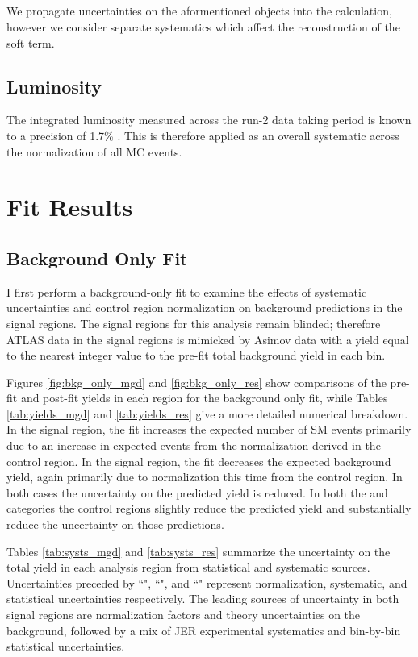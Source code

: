 \subsection{\met}
We propagate uncertainties on the aformentioned objects into the \met calculation, however we consider separate \met systematics which affect the reconstruction of the \met soft term.

\subsection{Luminosity}
The integrated luminosity measured across the run-2 data taking period is known to a precision of 1.7\% \cite{lumi_unc}. This is therefore applied as an overall systematic across the normalization of all MC events.

\section{Fit Results}
\subsection{Background Only Fit}
I first perform a background-only fit to examine the effects of systematic uncertainties and control region normalization on background predictions in the signal regions. The signal regions for this analysis remain blinded; therefore ATLAS data in the signal regions is mimicked by Asimov data with a yield equal to the nearest integer value to the pre-fit total background yield in each bin.

Figures \ref{fig:bkg_only_mgd} and \ref{fig:bkg_only_res} show comparisons of the pre-fit and post-fit yields in each region for the background only fit, while Tables \ref{tab:yields_mgd} and \ref{tab:yields_res} give a more detailed numerical breakdown. In the \merged signal region, the fit increases the expected number of SM events primarily due to an increase in expected \wjets events from the normalization derived in the \merged \wjets control region. In the \resolved signal region, the fit decreases the expected background yield, again primarily due to normalization this time from the \resolved \wjets control region. In both cases the uncertainty on the predicted \wjets yield is reduced. In both the \merged and \resolved categories the \ttbar control regions slightly reduce the predicted \ttbar yield and substantially reduce the uncertainty on those predictions.

Tables \ref{tab:systs_mgd} and \ref{tab:systs_res} summarize the uncertainty on the total yield in each analysis region from statistical and systematic sources. Uncertainties preceded by ``\mu", ``\alpha", and ``\gamma" represent normalization, systematic, and statistical uncertainties respectively. The leading sources of uncertainty in both signal regions are normalization factors and theory uncertainties on the \wjets background, followed by a mix of JER experimental systematics and bin-by-bin statistical uncertainties.

